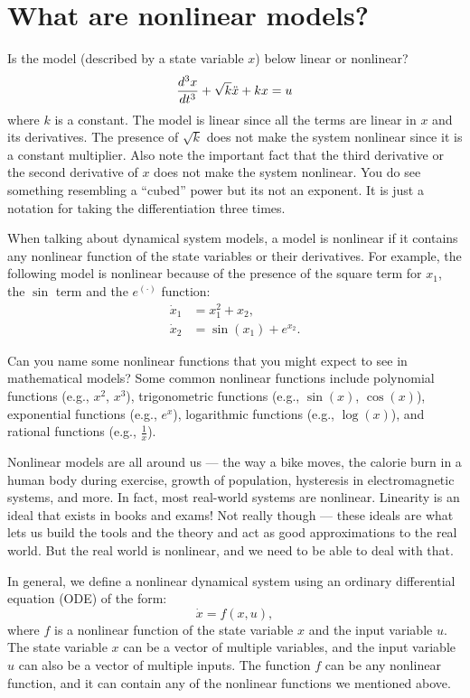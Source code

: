 \documentclass{ee122_notes}
\begin{document}
\section{What are nonlinear models?}
\begin{popquiz}
Is the model (described by a state variable $x$) below linear or nonlinear?
\[
\frac{d^3 x}{dt^3} + \sqrt{k}\Ddot x + kx = u
\]
where $k$ is a constant.
\popqsplit 
The model is linear since all the terms are linear in $x$ and its derivatives. The presence of $\sqrt{k}$ does not make the system nonlinear since it is a constant multiplier. Also note the important fact that the third derivative or the second derivative of $x$ does not make the system nonlinear. You do see something resembling a ``cubed'' power but its not an exponent. It is just a notation for taking the differentiation three times.
\end{popquiz}
When talking about dynamical system models, a model is nonlinear if it contains any nonlinear function of the state variables or their derivatives. For example, the following model is nonlinear because of the presence of the square term for $x_1$, the $\sin$ term and the $e^{(\cdot)}$ function:
\[
\begin{aligned}
\dot x_1 &= x_1^2 + x_2,\\
\dot x_2 &= \sin(x_1) + e^{x_2}.
\end{aligned}
\]
\begin{popquiz}
    Can you name some nonlinear functions that you might expect to see in mathematical models?
\popqsplit
Some common nonlinear functions include polynomial functions (e.g., $x^2$, $x^3$), trigonometric functions (e.g., $\sin(x)$, $\cos(x)$), exponential functions (e.g., $e^x$), logarithmic functions (e.g., $\log(x)$), and rational functions (e.g., $\frac{1}{x}$).
\end{popquiz}

Nonlinear models are all around us --- the way a bike moves, the calorie burn in a human body during exercise, growth of population, hysteresis in electromagnetic systems, and more. In fact, most real-world systems are nonlinear. Linearity is an ideal that exists in books and exams! Not really though --- these ideals are what lets us build the tools and the theory and act as good approximations to the real world. But the real world is nonlinear, and we need to be able to deal with that.

In general, we define a nonlinear dynamical system using an ordinary differential equation (ODE) of the form:
\[
\dot x = f(x,u),
\]
where $f$ is a nonlinear function of the state variable $x$ and the input variable $u$. The state variable $x$ can be a vector of multiple variables, and the input variable $u$ can also be a vector of multiple inputs. The function $f$ can be any nonlinear function, and it can contain any of the nonlinear functions we mentioned above.
\end{document}

